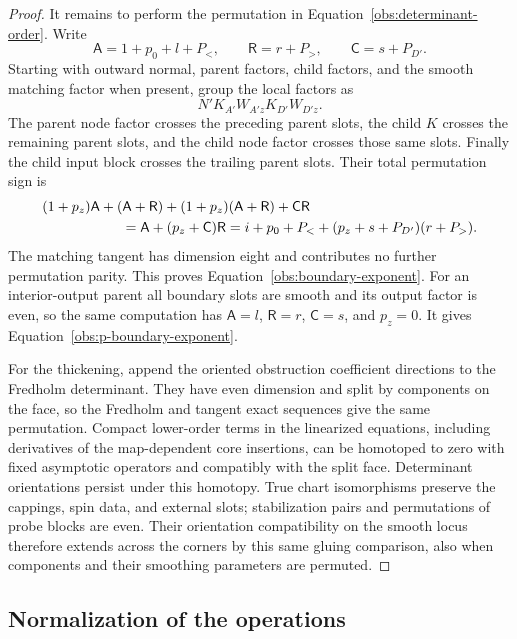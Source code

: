 \documentclass[11pt]{article}
\theoremstyle{definition}
\theoremstyle{remark}
\numberwithin{equation}{section}
\begin{document}
\begin{proof}
It remains to perform the permutation in
Equation~\eqref{obs:determinant-order}.  Write
\[
 \mathsf A=1+p_0+l+P_<,\qquad
 \mathsf R=r+P_>,\qquad \mathsf C=s+P_{D'}.
\]
Starting with outward normal, parent factors, child factors, and
the smooth matching factor when present, group the local factors as
\[
 N'K_{A'}W_{A'z}K_{D'}W_{D'z}.
\]
The parent node factor crosses the preceding parent slots, the
child $K$ crosses the remaining parent slots, and the child node
factor crosses those same slots.  Finally the child input block
crosses the trailing parent slots.  Their total permutation sign is
\begin{align*}
 &(1+p_z)\mathsf A+(\mathsf A+\mathsf R)
       +(1+p_z)(\mathsf A+\mathsf R)+\mathsf C\mathsf R\\
 &\hspace{20mm}=\mathsf A+(p_z+\mathsf C)\mathsf R
   =i+p_0+P_<+(p_z+s+P_{D'})(r+P_>).
\end{align*}
The matching tangent has dimension eight and contributes no further
permutation parity.  This proves
Equation~\eqref{obs:boundary-exponent}.  For an interior-output
parent all boundary slots are smooth and its output factor is
even, so the same computation has $\mathsf A=l$, $\mathsf R=r$,
$\mathsf C=s$, and
$p_z=0$.  It gives Equation~\eqref{obs:p-boundary-exponent}.

For the thickening, append the oriented obstruction coefficient
directions to the Fredholm determinant.  They have even dimension
and split by components on the face, so the Fredholm and tangent
exact sequences give the same permutation.  Compact lower-order
terms in the linearized equations, including derivatives of the
map-dependent core insertions, can be homotoped to zero with fixed
asymptotic operators and compatibly with the split face.
Determinant orientations persist under this homotopy.  True chart
isomorphisms preserve the cappings, spin data, and external slots;
stabilization pairs and permutations of probe blocks are even.
Their orientation compatibility on the smooth locus therefore
extends across the corners by this same gluing comparison, also
when components and their smoothing parameters are permuted.
\end{proof}

\subsection{Normalization of the operations}
\end{document}
